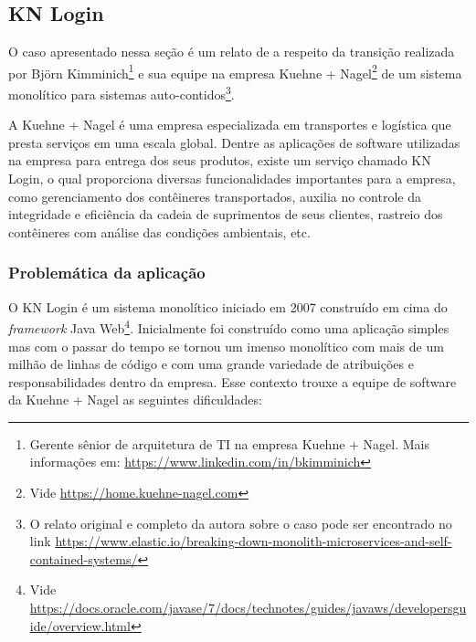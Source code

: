 \subsection{KN Login}
\label{sec:KNLogin}

O caso apresentado nessa seção é um relato de  a respeito
da transição realizada por Björn Kimminich\footnote{Gerente sênior de arquitetura de TI na empresa
Kuehne + Nagel. Mais informações em: \url{https://www.linkedin.com/in/bkimminich}} e sua equipe na empresa
Kuehne + Nagel\footnote{Vide \url{https://home.kuehne-nagel.com}} de um sistema monolítico para sistemas
auto-contidos\footnote{O relato original e completo da autora sobre o caso pode ser encontrado no link
\url{https://www.elastic.io/breaking-down-monolith-microservices-and-self-contained-systems/}}. 

A Kuehne + Nagel é uma empresa especializada em transportes e logística que presta serviços em uma
escala global. Dentre as aplicações de software utilizadas na empresa para entrega dos seus
produtos, existe um serviço chamado KN Login, o qual proporciona diversas funcionalidades
importantes para a empresa, como gerenciamento dos contêineres transportados, auxilia no controle da
integridade e eficiência da cadeia de suprimentos de seus clientes, rastreio dos contêineres com
análise das condições ambientais, etc.

\subsubsection{Problemática da aplicação}

O KN Login é um sistema monolítico iniciado em 2007 construído em cima do \textit{framework}
Java Web\footnote{Vide \url{https://docs.oracle.com/javase/7/docs/technotes/guides/javaws/developersguide/overview.html}}.
Inicialmente foi construído como uma aplicação simples mas com o passar do tempo se tornou um imenso
monolítico com mais de um milhão de linhas de código e com uma grande variedade de atribuições e
responsabilidades dentro da empresa. Esse contexto trouxe a equipe de software da Kuehne + Nagel as
seguintes dificuldades:

